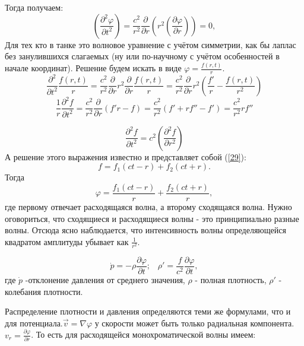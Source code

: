 \documentclass[14pt,a4paper,oneside]{extarticle}	%
\newcommand{\bracket}[1] {\left( #1 \right) } %
\newcommand{\dif}[2] {\bracket{ \frac{\partial #1}{\partial #2} }}
\begin{document}
Тогда получаем:
\begin{equation*}
\dif{^{2}\varphi}{t^{2}} =  \frac{c^{2}}{r^{2}}\frac{\partial }{\partial r}\left(r^{2} \dif{\varphi}{r}\right)  = 0,
\end{equation*}
Для тех кто в танке это волновое уравнение с учётом симметрии, как бы лаплас без занулившихся слагаемых (ну или по-научному с учётом особенностей в начале координат).
Решение будем искать в виде $ \varphi =\frac{f(r,t)}{r} $.
\begin{equation*}
\frac{\partial^{2} }{\partial t^{2}} \frac{f(r,t)}{r} = \frac{c^{2}}{r^{2}}\frac{\partial }{\partial r}r^{2}\frac{\partial }{\partial r}\frac{f(r,t)}{r} = \frac{c^{2}}{r^{2}}\frac{\partial }{\partial r}r^{2}\left(\frac{f'}{r} - \frac{f(r,t)}{r^{2}} \right)  
\end{equation*}
\begin{equation*}
\frac{1}{r}\frac{\partial^{2}f }{\partial t^{2}} = \frac{c^{2}}{r^{2}}\frac{\partial }{\partial r}\left(f'r - f \right) = \frac{c^{2}}{r^{2}}(f'+rf''-f')=\frac{c^{2}}{r^{2}}rf''
\end{equation*}

\begin{equation*}
\frac{\partial^{2}f }{\partial t^{2}} = c^{2}\left(\frac{\partial^{2}f }{\partial r^{2}} \right) 
\end{equation*}
А решение этого выражения известно и представляет собой (\ref{29}):
\begin{equation*}
f = f_{1}(ct-r) + f_{2}(ct+r).
\end{equation*}
Тогда 
\begin{equation*}
\varphi = \frac{f_{1}(ct-r)}{r} + \frac{f_{2}(ct+r)}{r},
\end{equation*}
где первому отвечает расходящаяся волна, а второму сходящаяся волна. Нужно оговориться, что сходящиеся и расходящиеся волны - это принципиально разные волны.
Отсюда ясно наблюдается, что интенсивность волны определяющейся квадратом амплитуды убывает как $ \frac{1}{r^{2}} $.

\begin{equation*}
\dot{p} = -\rho \frac{\partial\varphi}{\partial t};\;\;\;\rho' = \frac{f}{c^{2}}\frac{\partial\varphi}{\partial t},
\end{equation*}
где $ \dot{p} $ -отклонение давления от среднего значения, $ \rho $ - полная плотность, $ \rho' $ - колебания плотности.

Распределение плотности и давления определяются теми же формулами, что и для потенциала.$ \vec{v} = \nabla\varphi $ у скорости может быть только радиальная компонента.$ v_{r} = \frac{\partial\varphi}{\partial r} $. То есть для расходящейся монохроматической волны имеем:
\end{document}

